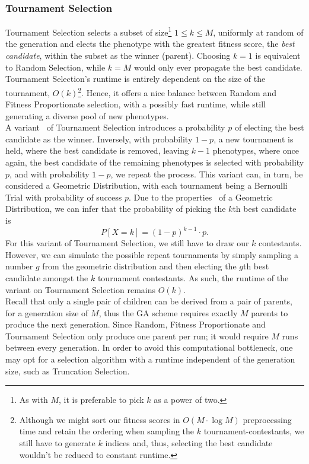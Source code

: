 \subsubsection{Tournament Selection}
Tournament Selection selects a subset of size\footnote{As with $M$, it is preferable to pick $k$ as a power of two.} $1 \leq k \leq M$, uniformly at random of the generation and elects the phenotype with the greatest fitness score, the \textit{best candidate}, within the subset as the winner (parent). Choosing $k = 1 $ is equivalent to Random Selection, while $k = M$ would only ever propagate the best candidate.
\\
Tournament Selection's runtime is entirely dependent on the size of the tournament, $O(k)$\footnote{Although we might sort our fitness scores in $O(M \cdot \log M)$ preprocessing time and retain the ordering when sampling the $k$ tournament-contestants, we still have to generate $k$ indices and, thus, selecting the best candidate wouldn't be reduced to constant runtime.}. Hence, it offers a nice balance between Random and Fitness Proportionate selection, with a possibly fast runtime, while still generating a diverse pool of new phenotypes.
\\
A variant~\cite{Wiki-tournament-selection} of Tournament Selection introduces a probability $p$ of electing the best candidate as the winner. Inversely, with probability $1-p$, a new tournament is held, where the best candidate is removed, leaving $k-1$ phenotypes, where once again, the best candidate of the remaining phenotypes is selected with probability $p$, and with probability $1-p$, we repeat the process. This variant can, in turn, be considered a Geometric Distribution, with each tournament being a Bernoulli Trial with probability of success $p$. Due to the properties~\cite{Wiki-geometric-distribution} of a Geometric Distribution, we can infer that the probability of picking the $k$th best candidate is
\begin{equation*}
    P\left[ X = k \right] = (1-p)^{k-1} \cdot p.
\end{equation*}
For this variant of Tournament Selection, we still have to draw our $k$ contestants. However, we can simulate the possible repeat tournaments by simply sampling a number $g$ from the geometric distribution and then electing the $g$th best candidate amongst the $k$ tournament contestants. As such, the runtime of the variant on Tournament Selection remains $O(k)$.
\\
Recall that only a single pair of children can be derived from a pair of parents, for a generation size of $M$, thus the GA scheme requires exactly $M$ parents to produce the next generation. Since Random, Fitness Proportionate and Tournament Selection only produce one parent per run; it would require $M$ runs between every generation. In order to avoid this computational bottleneck, one may opt for a selection algorithm with a runtime independent of the generation size, such as Truncation Selection.

